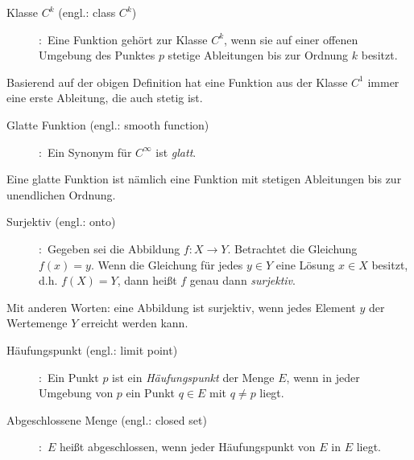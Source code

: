 \begin{Def}
	\begin{description}
		\item[Klasse $C^{k}$ (engl.: class $C^{k}$)]
		\cite[S. 265]{grosche2003teubner}:~Eine Funktion gehört zur Klasse $C^{k}$, wenn sie auf einer offenen Umgebung des Punktes $p$ stetige Ableitungen bis zur Ordnung $k$ besitzt.
	\end{description}
\end{Def}
\vspace{-0.8em}
Basierend auf der obigen Definition hat eine Funktion aus der Klasse $C^{1}$ immer eine erste Ableitung, die auch stetig ist.
\begin{Def}
	\begin{description}
		\item[Glatte Funktion (engl.: smooth function)]
		\cite[S. 5]{tu2010introduction}:~Ein Synonym für $C^{\infty}$ ist \emph{glatt}.
	\end{description}
\end{Def}
\vspace{-0.8em}
Eine glatte Funktion ist nämlich eine Funktion mit stetigen Ableitungen bis zur unendlichen Ordnung.
\begin{Def}
	\begin{description}
		\item[Surjektiv (engl.: onto)]
		\cite[S. 931]{grosche2003teubner}:~Gegeben sei die Abbildung $f:X \to Y$. Betrachtet die Gleichung $f\left ( x \right )=y$. Wenn die Gleichung für jedes $y\in Y$ eine Lösung $x\in X$ besitzt, d.h. $f\left ( X \right )=Y$, dann heißt $f$ genau dann \emph{surjektiv}.
	\end{description}
\end{Def}
\vspace{-0.8em}
Mit anderen Worten: eine Abbildung ist surjektiv, wenn jedes Element $y$ der Wertemenge $Y$ erreicht werden kann.
\begin{Def}
	\begin{description}
		\item[Häufungspunkt (engl.: limit point)]
		\cite[S. 35]{rudin2009analysis}:~Ein Punkt $p$ ist ein \emph{Häufungspunkt} der Menge $E$, wenn in jeder Umgebung von $p$ ein Punkt $q\in E$ mit $q\neq p$ liegt.
	\end{description}
\end{Def}
\begin{Def}
	\begin{description}
		\item[Abgeschlossene Menge (engl.: closed set)]
		\cite[S. 36]{rudin2009analysis}:~$E$ heißt abgeschlossen, wenn jeder Häufungspunkt von $E$ in $E$ liegt.
	\end{description}
\end{Def}
